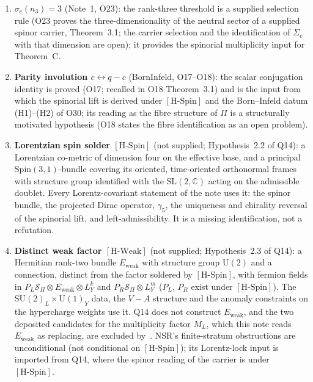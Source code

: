 \documentclass[11pt,a4paper]{article}
\theoremstyle{definition}
\newcommand{\SU}{\mathrm{SU}}
\newcommand{\UU}{\mathrm{U}}
\newcommand{\Spin}{\mathrm{Spin}}
\newcommand{\SL}{\mathrm{SL}}
\newcommand{\Sbundle}{\mathcal{S}_\Pi}
\newcommand{\Ew}{E_{\mathrm{weak}}}
\newcommand{\HSpin}{\ensuremath{[\mathrm{H\text{-}Spin}]}}
\newcommand{\HWeak}{\ensuremath{[\mathrm{H\text{-}Weak}]}}
\begin{document}
\begin{enumerate}
      \item \textbf{$\sigma_c(n_3) = 3$} (Note~1, O23):
      the rank-three threshold is a supplied selection rule (O23 proves the
      three-dimensionality of the neutral sector of a supplied spinor carrier, Theorem~3.1;
      the carrier selection and the identification of $\Sigma_c$ with that dimension are open);
      it provides the spinorial multiplicity input for Theorem~C.

      \item \textbf{Parity involution $c \leftrightarrow q-c$} (BornInfeld, O17--O18):
      the scalar conjugation identity is proved (O17; recalled in O18 Theorem~3.1) and is the
      input from which the spinorial lift is derived under \HSpin{} and the Born--Infeld datum (H1)--(H2) of O30;
      its reading as the fibre structure of
      $\Pi$ is a structurally motivated hypothesis (O18 states the fibre identification as an
      open problem).

      \item \textbf{Lorentzian spin solder \HSpin{}} (not supplied; Hypothesis~2.2 of Q14):
      a Lorentzian co-metric of dimension four on the effective base, and a principal $\Spin(3,1)$-bundle covering its
      oriented, time-oriented orthonormal frames with structure group identified with the $\SL(2,\mathbb{C})$
      acting on the admissible doublet.
      Every Lorentz-covariant statement of the note uses it: the spinor bundle, the projected Dirac operator,
      $\gamma_5$, the uniqueness and chirality reversal of the spinorial lift, and left-admissibility.
      It is a missing identification, not a refutation.

      \item \textbf{Distinct weak factor \HWeak{}} (not supplied; Hypothesis~2.3 of Q14):
      a Hermitian rank-two bundle $\Ew$ with structure group $\UU(2)$ and a connection, distinct from the factor
      soldered by \HSpin{}, with fermion fields in $P_L \Sbundle \otimes \Ew \otimes L_Y^{k}$ and
      $P_R \Sbundle \otimes L_Y^{m}$ ($P_L$, $P_R$ exist under \HSpin{}).
      The $\SU(2)_L \times \UU(1)_Y$ data, the $V-A$ structure and the anomaly constraints on the hypercharge weights
      use it.
      Q14 does not construct $\Ew$, and the two deposited candidates for the multiplicity factor $M_L$, which this
      note reads $\Ew$ as replacing, are excluded by~\cite{Beau2026nsr}.
      NSR's finite-stratum obstructions are unconditional (not conditional on \HSpin{}); its Lorentz-lock input is
      imported from Q14, where the spinor reading of the carrier is under \HSpin{}.
    \end{enumerate}
\end{document}
